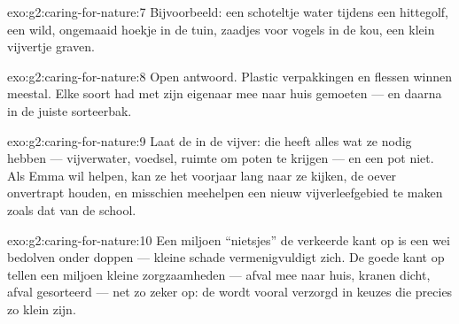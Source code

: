 \begin{solution}{exo:g2:caring-for-nature:7}
Bijvoorbeeld: een schoteltje water tijdens een hittegolf, een wild,
ongemaaid hoekje in de tuin, zaadjes voor vogels in de kou, een klein
vijvertje graven.
\end{solution}

\begin{solution}{exo:g2:caring-for-nature:8}
Open antwoord. Plastic verpakkingen en flessen winnen meestal. Elke
soort had met zijn eigenaar mee naar huis gemoeten --- en daarna in de
juiste sorteerbak.
\end{solution}

\begin{solution}{exo:g2:caring-for-nature:9}
Laat de  in de vijver: die heeft alles wat ze nodig hebben
--- vijverwater, voedsel, ruimte om poten te krijgen --- en een pot
niet. Als Emma wil helpen, kan ze het voorjaar lang naar ze kijken, de
oever onvertrapt houden, en misschien meehelpen een nieuw
vijverleefgebied te maken zoals dat van de school.
\end{solution}

\begin{solution}{exo:g2:caring-for-nature:10}
Een miljoen ``nietsjes'' de verkeerde kant op is een wei bedolven onder
doppen --- kleine schade vermenigvuldigt zich. De goede kant op tellen
een miljoen kleine zorgzaamheden --- afval mee naar huis, kranen dicht,
afval gesorteerd --- net zo zeker op: de  wordt vooral verzorgd
in keuzes die precies zo klein zijn.
\end{solution}

